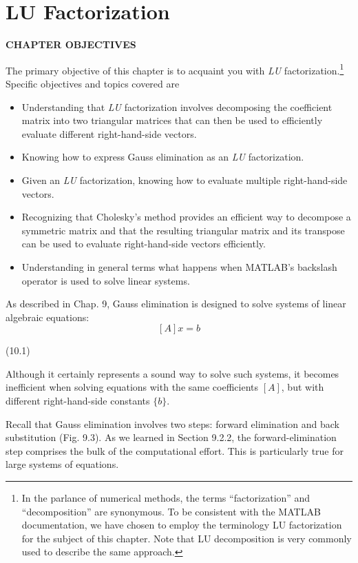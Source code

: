 \documentclass[../main.tex]{subfiles}
\begin{document}
\theoremstyle{definition}

\chapter{LU Factorization}

\begin{center}
\textbf{CHAPTER OBJECTIVES}
\end{center}
The primary objective of this chapter is to acquaint you with \textit{LU} factorization.\label{oneLU}\footnote{In the parlance of numerical methods, the terms “factorization” and “decomposition” are synonymous. To be
consistent with the MATLAB documentation, we have chosen to employ the terminology LU factorization for
the subject of this chapter. Note that LU decomposition is very commonly used to describe the same approach.}
Specific objectives and topics covered are
\begin{itemize}
	\item Understanding that \textit{LU} factorization involves decomposing the coefficient matrix into two triangular matrices that can then be used to efficiently evaluate different right-hand-side vectors.
	\item Knowing how to express Gauss elimination as an \textit{LU} factorization.
	\item Given an \textit{LU} factorization, knowing how to evaluate multiple right-hand-side vectors.
	\item Recognizing that Cholesky’s method provides an efficient way to decompose a symmetric matrix and that the resulting triangular matrix and its transpose can be used to evaluate right-hand-side vectors efficiently.
	\item Understanding in general terms what happens when MATLAB’s backslash operator is used to solve linear systems.
\end{itemize}

As described in Chap. 9, Gauss elimination is designed to solve systems of linear algebraic equations:
$$[A]{x}={b}$$
\begin{flushright}
(10.1)
\end{flushright}
Although it certainly represents a sound way to solve such systems, it becomes inefficient when solving equations with the same coefficients $[A]$, but with different right-hand-side constants $\{b\}$.

Recall that Gauss elimination involves two steps: forward elimination and back substitution (Fig. 9.3). As we learned in Section 9.2.2, the forward-elimination step comprises the bulk of the computational effort. This is particularly true for large systems of equations.
\end{document}
